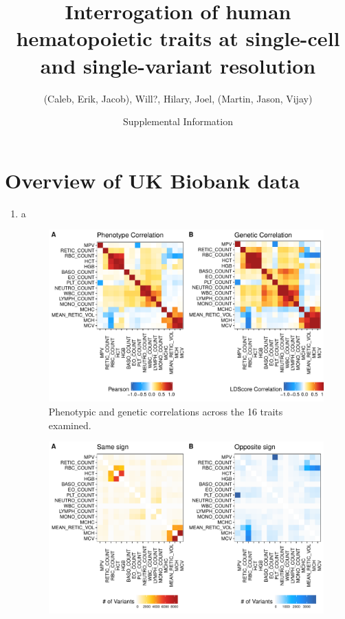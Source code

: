 \documentclass{article}\usepackage[]{graphicx}\usepackage[]{color}
\title{Interrogation of human hematopoietic traits at single-cell and single-variant resolution}
\date{Supplemental Information}
\author{(Caleb, Erik, Jacob), Will?, Hilary, Joel, (Martin, Jason, Vijay)}
\makeatletter
\def\maxwidth{ %
  \ifdim\Gin@nat@width>\linewidth
    \linewidth
  \else
    \Gin@nat@width
  \fi
}
\newenvironment{knitrout}{}{} %
\makeatother
\begin{document}
\maketitle
\section*{Overview of UK Biobank data}
\begin{enumerate}[label=(\Alph*)]
\item 
a



\begin{knitrout}
\color{fgcolor}\begin{figure}[H]

{\centering \includegraphics[width=\maxwidth]{figure/correlationPlots-1} 

}

\caption[Phenotypic and genetic correlations across the 16 traits examined]{Phenotypic and genetic correlations across the 16 traits examined. }\label{fig:correlationPlots}
\end{figure}


\end{knitrout}




\begin{knitrout}
\color{fgcolor}\begin{figure}[H]

{\centering \includegraphics[width=\maxwidth]{figure/pleiotropyPlots-1} 

}
\end{figure}
\end{knitrout}
\end{enumerate}
\end{document}
